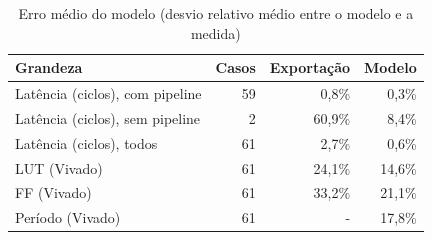 
\begin{table}[htbp]
\centering
\caption{Erro médio do modelo (desvio relativo médio entre o modelo e a medida)}
\begin{tabular}{|l|r|r|r|}
\hline
\rowcolor{tabAzul}\color{white}Grandeza & \color{white}Casos & \color{white}Exportação & \color{white}Modelo \\
\hline
Latência (ciclos), com pipeline & 59 & 0,8\% & 0,3\% \\ \hline
Latência (ciclos), sem pipeline & 2 & 60,9\% & 8,4\% \\ \hline
Latência (ciclos), todos & 61 & 2,7\% & 0,6\% \\ \hline
LUT (Vivado) & 61 & 24,1\% & 14,6\% \\ \hline
FF (Vivado) & 61 & 33,2\% & 21,1\% \\ \hline
Período (Vivado) & 61 & - & 17,8\% \\ \hline
\end{tabular}
\end{table}

